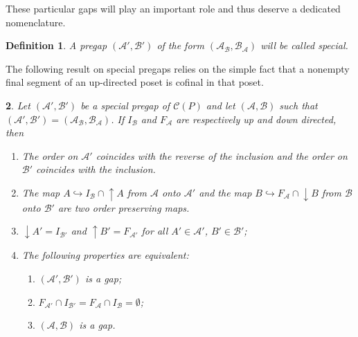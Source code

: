 \documentclass[12pt]{amsart}
\newtheorem{definition}{{\bf Definition}}[section]
\newtheorem{lemma}[definition]{\noindent {\bf Lemma}}
\begin{document}
\medskip

These particular gaps will play an important role and thus deserve a
dedicated nomenclature. 

\begin{definition} 
A pregap $(\mathcal A', \mathcal B' )$ of the form $(\mathcal
A_{\mathcal B}, \mathcal B_{\mathcal A})$ will be called
\emph{special}.
\end{definition} 

The following result on special pregaps relies on the simple fact that
a nonempty final segment of an up-directed poset is cofinal in that
poset.

\begin{lemma}\label{lem:pregapsbis}
Let $(\mathcal A', \mathcal B')$ be a special pregap of
$\mathcal C (P)$ and let $(\mathcal A, \mathcal B)$ such that
$(\mathcal A', \mathcal B')= (\mathcal A_{\mathcal B}, \mathcal
B_{\mathcal A})$. If $I_{\mathcal B}$ and $F_{\mathcal A}$ are
respectively up and down directed, then

\begin{enumerate} [{(i)}]
\item The order on $\mathcal A'$ coincides with the reverse of the inclusion and the order on $\mathcal B'$ coincides with the inclusion. 
\item   The map $A\hookrightarrow I_{\mathcal B} \cap {\uparrow \!\!} A$ from $\mathcal A$ onto $\mathcal A'$ and the map  $B\hookrightarrow F_{\mathcal A}\cap {\downarrow \!\!} B$ from $\mathcal B$ onto $\mathcal B'$ are two order preserving maps. 
\item ${\downarrow \!\!} A'=I_{\mathcal B'}$ and ${\uparrow \!\!}  B'=F_{\mathcal A'}$ for all $A'\in \mathcal A'$, $B'\in \mathcal B'$;
\item The following properties are equivalent:

\begin{enumerate} 
\item $(\mathcal A', \mathcal B')$ is a gap; 
\item $F_{\mathcal A'}\cap I_{\mathcal B'}=F_{\mathcal A}\cap I_{\mathcal
 B}=\emptyset$; \item $(\mathcal A, \mathcal B)$ is a gap.
\end{enumerate}

\end{enumerate}
\end{lemma}
\end{document}
